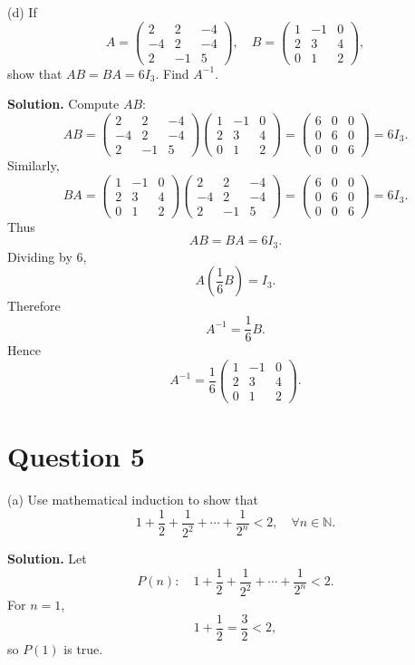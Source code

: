 \documentclass[11pt,a4paper]{article}
\newcommand{\question}[1]{\vspace{0.4em}\begin{tcolorbox}[colback=gray!8,colframe=black!55,title=Question,fonttitle=\bfseries]#1\end{tcolorbox}}
\newcommand{\answer}{\textbf{Solution. }}
\newcommand{\N}{\mathbb{N}}
\begin{document}
\question{(d) If
\[
A=\begin{pmatrix}2&2&-4\\-4&2&-4\\2&-1&5\end{pmatrix},
\quad
B=\begin{pmatrix}1&-1&0\\2&3&4\\0&1&2\end{pmatrix},
\]
show that $AB=BA=6I_3$. Find $A^{-1}$.}
\answer
Compute $AB$:
\[
AB=\begin{pmatrix}2&2&-4\\-4&2&-4\\2&-1&5\end{pmatrix}
\begin{pmatrix}1&-1&0\\2&3&4\\0&1&2\end{pmatrix}
=\begin{pmatrix}6&0&0\\0&6&0\\0&0&6\end{pmatrix}=6I_3.
\]
Similarly,
\[
BA=\begin{pmatrix}1&-1&0\\2&3&4\\0&1&2\end{pmatrix}
\begin{pmatrix}2&2&-4\\-4&2&-4\\2&-1&5\end{pmatrix}
=\begin{pmatrix}6&0&0\\0&6&0\\0&0&6\end{pmatrix}=6I_3.
\]
Thus
\[
AB=BA=6I_3.
\]
Dividing by $6$,
\[
A\left(\frac16B\right)=I_3.
\]
Therefore
\[
A^{-1}=\frac16B.
\]
Hence
\[
\boxed{A^{-1}=\frac16\begin{pmatrix}1&-1&0\\2&3&4\\0&1&2\end{pmatrix}}.
\]

\section*{Question 5}

\question{(a) Use mathematical induction to show that
\[
1+\frac12+\frac1{2^2}+\cdots+\frac1{2^n}<2,
\quad \forall n\in\N.
\]}
\answer
Let
\[
P(n):\quad 1+\frac12+\frac1{2^2}+\cdots+\frac1{2^n}<2.
\]
For $n=1$,
\[
1+\frac12=\frac32<2,
\]
so $P(1)$ is true.
\end{document}
